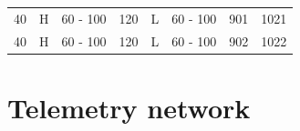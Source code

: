 \begin{table}[]
\begin{tabular}{l|lll|lll|l}
40                                                                                     & H  & 60 - 100                                                          & 120                                                         & L  & 60 - 100                                                          & 901                                                         & 1021                                                                                 \\
40                                                                                     & H  & 60 - 100                                                          & 120                                                         & L  & 60 - 100                                                          & 902                                                         & 1022                                                                                 \\
\bottomrule
\end{tabular}
\end{table}
\renewcommand{\arraystretch}{1}

\section{Telemetry network}
\label{Telemetry_network}
\setcounter{table}{0} \renewcommand{\thetable}{B.\arabic{table}}

